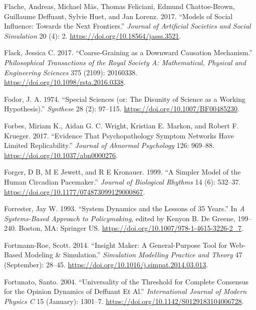 \documentclass[
  a4paper,
  DIV=11,
  numbers=noendperiod,
  oneside]{scrreprt}
\newlength{\cslhangindent}
\newenvironment{CSLReferences}[2] %
 {\begin{list}{}{%
  \setlength{\itemindent}{0pt}
  \setlength{\leftmargin}{0pt}
  \setlength{\parsep}{0pt}
  \ifodd #1
   \setlength{\leftmargin}{\cslhangindent}
   \setlength{\itemindent}{-1\cslhangindent}
  \fi
  \setlength{\itemsep}{#2\baselineskip}}}
 {\end{list}}
\begin{document}
\begin{CSLReferences}{1}{0}
Flache, Andreas, Michael Mäs, Thomas Feliciani, Edmund Chattoe-Brown,
Guillaume Deffuant, Sylvie Huet, and Jan Lorenz. 2017. {``Models of
{Social Influence}: {Towards} the {Next Frontiers}.''} \emph{Journal of
Artificial Societies and Social Simulation} 20 (4): 2.
\url{https://doi.org/10.18564/jasss.3521}.

Flack, Jessica C. 2017. {``Coarse-Graining as a Downward Causation
Mechanism.''} \emph{Philosophical Transactions of the Royal Society A:
Mathematical, Physical and Engineering Sciences} 375 (2109): 20160338.
\url{https://doi.org/10.1098/rsta.2016.0338}.

Fodor, J. A. 1974. {``Special Sciences (or: {The} Disunity of Science as
a Working Hypothesis).''} \emph{Synthese} 28 (2): 97--115.
\url{https://doi.org/10.1007/BF00485230}.

Forbes, Miriam K., Aidan G. C. Wright, Kristian E. Markon, and Robert F.
Krueger. 2017. {``Evidence That Psychopathology Symptom Networks Have
Limited Replicability.''} \emph{Journal of Abnormal Psychology} 126:
969--88. \url{https://doi.org/10.1037/abn0000276}.

Forger, D B, M E Jewett, and R E Kronauer. 1999. {``A Simpler Model of
the Human Circadian Pacemaker.''} \emph{Journal of Biological Rhythms}
14 (6): 532--37. \url{https://doi.org/10.1177/074873099129000867}.

Forrester, Jay W. 1993. {``System {Dynamics} and the {Lessons} of 35
{Years}.''} In \emph{A {Systems-Based Approach} to {Policymaking}},
edited by Kenyon B. De Greene, 199--240. {Boston, MA}: {Springer US}.
\url{https://doi.org/10.1007/978-1-4615-3226-2_7}.

Fortmann-Roe, Scott. 2014. {``Insight {Maker}: {A} General-Purpose Tool
for Web-Based Modeling \& Simulation.''} \emph{Simulation Modelling
Practice and Theory} 47 (September): 28--45.
\url{https://doi.org/10.1016/j.simpat.2014.03.013}.

Fortunato, Santo. 2004. {``Universality of the {Threshold} for {Complete
Consensus} for the {Opinion Dynamics} of {Deffuant} Et Al.''}
\emph{International Journal of Modern Physics C} 15 (January): 1301--7.
\url{https://doi.org/10.1142/S0129183104006728}.


\end{CSLReferences}
\end{document}
